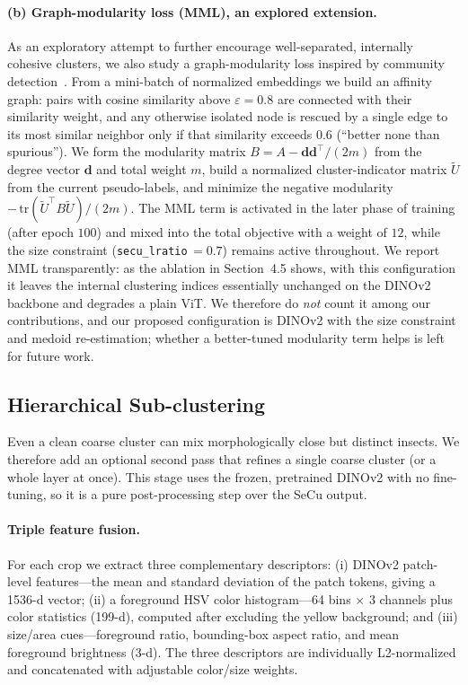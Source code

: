 \documentclass[10pt,a4paper,twocolumn]{article}
\begin{document}
\paragraph{(b) Graph-modularity loss (MML), an explored extension.}
As an exploratory attempt to further encourage well-separated, internally cohesive clusters, we also study a graph-modularity loss inspired by community detection~\cite{newman2006modularity}. From a mini-batch of normalized embeddings we build an affinity graph: pairs with cosine similarity above $\varepsilon\!=\!0.8$ are connected with their similarity weight, and any otherwise isolated node is rescued by a single edge to its most similar neighbor only if that similarity exceeds $0.6$ (``better none than spurious''). We form the modularity matrix $B = A - \mathbf{d}\mathbf{d}^{\!\top}\!/(2m)$ from the degree vector $\mathbf{d}$ and total weight $m$, build a normalized cluster-indicator matrix $\widetilde{U}$ from the current pseudo-labels, and minimize the negative modularity $-\,\mathrm{tr}(\widetilde{U}^{\!\top} B \widetilde{U})/(2m)$. The MML term is activated in the later phase of training (after epoch $100$) and mixed into the total objective with a weight of $12$, while the size constraint (\texttt{secu\_lratio}\,$=0.7$) remains active throughout. We report MML transparently: as the ablation in Section~4.5 shows, with this configuration it leaves the internal clustering indices essentially unchanged on the DINOv2 backbone and degrades a plain ViT. We therefore do \emph{not} count it among our contributions, and our proposed configuration is DINOv2 with the size constraint and medoid re-estimation; whether a better-tuned modularity term helps is left for future work.

\subsection{Hierarchical Sub-clustering}
Even a clean coarse cluster can mix morphologically close but distinct insects. We therefore add an optional second pass that refines a single coarse cluster (or a whole layer at once). This stage uses the frozen, pretrained DINOv2 with no fine-tuning, so it is a pure post-processing step over the SeCu output.

\paragraph{Triple feature fusion.}
For each crop we extract three complementary descriptors: (i) DINOv2 patch-level features---the mean and standard deviation of the patch tokens, giving a 1536-d vector; (ii) a foreground HSV color histogram---64 bins $\times$ 3 channels plus color statistics (199-d), computed after excluding the yellow background; and (iii) size/area cues---foreground ratio, bounding-box aspect ratio, and mean foreground brightness (3-d). The three descriptors are individually L2-normalized and concatenated with adjustable color/size weights.
\end{document}
